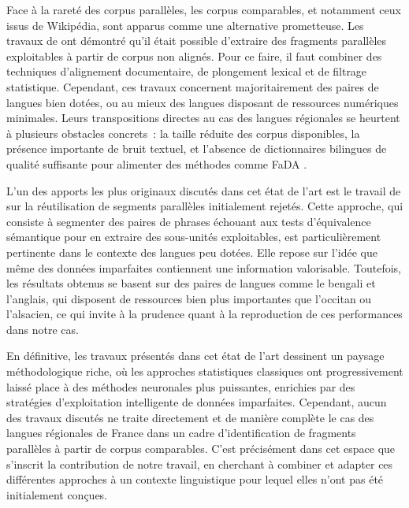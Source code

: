 Face à la rareté des corpus parallèles, les corpus comparables, et notamment ceux issus de Wikipédia, sont
apparus comme une alternative prometteuse. Les travaux de 
\citet{sharoff_2013a, sharoff_2016, steingrimsson_2021} ont démontré qu'il était possible d'extraire des fragments
parallèles exploitables à partir de corpus non alignés. Pour ce faire, il faut combiner des techniques d'alignement
documentaire, de plongement lexical et de filtrage statistique. Cependant, ces travaux concernent
majoritairement des paires de langues bien dotées, ou au mieux des langues disposant de ressources numériques
minimales. Leurs transpositions directes au cas des langues régionales se heurtent à plusieurs obstacles concrets~:
la taille réduite des corpus disponibles, la présence importante de bruit textuel, et l'absence de
dictionnaires bilingues de qualité suffisante pour alimenter des méthodes comme FaDA \citep{lohar_2016}.

L'un des apports les plus originaux discutés dans cet état de l'art est le travail de \citet{steingrimsson_2023}
sur la réutilisation de segments parallèles initialement rejetés. Cette approche, qui consiste à segmenter des
paires de phrases échouant aux tests d'équivalence sémantique pour en extraire des sous-unités exploitables,
est particulièrement pertinente dans le contexte des langues peu dotées. Elle repose sur l'idée que même des
données imparfaites contiennent une information valorisable. Toutefois, les résultats obtenus se basent sur des paires
de langues comme le bengali et l'anglais, qui disposent de ressources bien plus importantes que
l'occitan ou l'alsacien, ce qui invite à la prudence quant à la reproduction de ces performances dans notre cas.

En définitive, les travaux présentés dans cet état de l'art dessinent un paysage méthodologique riche, où les
approches statistiques classiques ont progressivement laissé place à des méthodes neuronales plus puissantes,
enrichies par des stratégies d'exploitation intelligente de données imparfaites.
Cependant, aucun des travaux discutés ne traite directement et de manière complète le cas des langues
régionales de France dans un cadre d'identification de fragments parallèles à partir de corpus comparables.
C'est précisément dans cet espace que s'inscrit la contribution de notre travail, en cherchant à combiner et
adapter ces différentes approches à un contexte linguistique pour lequel elles n'ont pas été initialement
conçues.